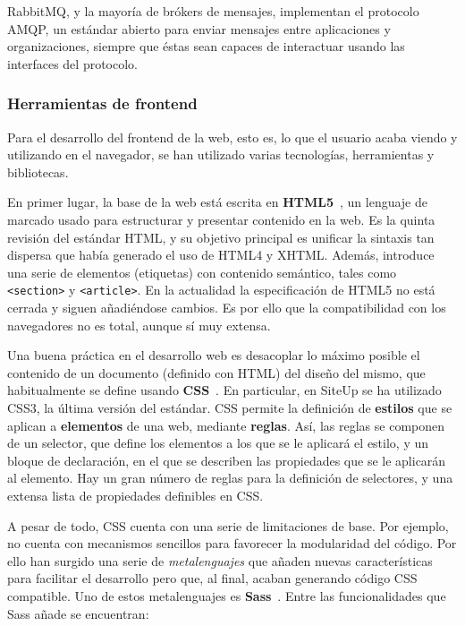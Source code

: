 RabbitMQ, y la mayoría de brókers de mensajes, implementan el protocolo
\ac{AMQP}, un estándar abierto para enviar mensajes entre aplicaciones y
organizaciones, siempre que éstas sean capaces de interactuar usando las
interfaces del protocolo.

\subsubsection{Herramientas de frontend}

Para el desarrollo del frontend de la web, esto es, lo que el usuario acaba
viendo y utilizando en el navegador, se han utilizado varias tecnologías,
herramientas y bibliotecas.

En primer lugar, la base de la web está escrita en \textbf{HTML5}~\cite{html5},
un lenguaje de marcado usado para estructurar y presentar contenido en la
web. Es la quinta revisión del estándar \ac{HTML}, y su objetivo principal es
unificar la sintaxis tan dispersa que había generado el uso de HTML4 y
XHTML. Además, introduce una serie de elementos (etiquetas) con contenido
semántico, tales como \texttt{<section>} y \texttt{<article>}. En la actualidad
la especificación de HTML5 no está cerrada y siguen añadiéndose cambios. Es por
ello que la compatibilidad con los navegadores no es total, aunque sí muy
extensa.

Una buena práctica en el desarrollo web es desacoplar lo máximo posible el
contenido de un documento (definido con HTML) del diseño del mismo, que
habitualmente se define usando \textbf{\ac{CSS}}~\cite{css}. En particular, en
SiteUp se ha utilizado CSS3, la última versión del estándar. CSS permite la
definición de \textbf{estilos} que se aplican a \textbf{elementos} de una web,
mediante \textbf{reglas}. Así, las reglas se componen de un selector, que define
los elementos a los que se le aplicará el estilo, y un bloque de declaración, en
el que se describen las propiedades que se le aplicarán al elemento. Hay un gran
número de reglas para la definición de selectores, y una extensa lista de
propiedades definibles en CSS.

A pesar de todo, CSS cuenta con una serie de limitaciones de base. Por ejemplo,
no cuenta con mecanismos sencillos para favorecer la modularidad del código. Por
ello han surgido una serie de \textit{metalenguajes} que añaden nuevas
características para facilitar el desarrollo pero que, al final, acaban
generando código CSS compatible. Uno de estos metalenguajes es
\textbf{\ac{Sass}}~\cite{sass}. Entre las funcionalidades que Sass añade se
encuentran:

